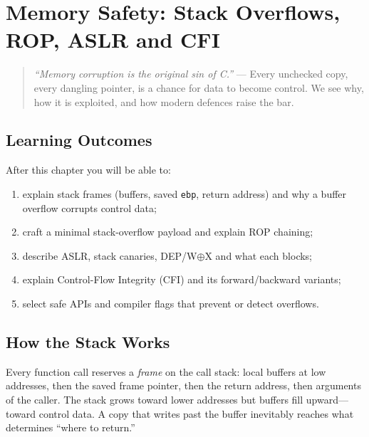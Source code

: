 \chapter{Memory Safety: Stack Overflows, ROP, ASLR and CFI}
\label{ch:memory}

\begin{quote}
\emph{``Memory corruption is the original sin of C.''} --- Every unchecked copy, every dangling pointer, is a chance for data to become control. We see why, how it is exploited, and how modern defences raise the bar.
\end{quote}

\noindent{}
\vspace{0.4em}

\section*{Learning Outcomes}
After this chapter you will be able to:
\begin{enumerate}[label=(L\arabic*)]
    \item explain stack frames (buffers, saved \texttt{ebp}, return address) and why a buffer overflow corrupts control data;
    \item craft a minimal stack-overflow payload and explain ROP chaining;
    \item describe ASLR, stack canaries, DEP/W$\oplus$X and what each blocks;
    \item explain Control-Flow Integrity (CFI) and its forward/backward variants;
    \item select safe APIs and compiler flags that prevent or detect overflows.
\end{enumerate}

\section{How the Stack Works}
\label{sec:stack-model}
Every function call reserves a \emph{frame} on the call stack: local buffers at low addresses, then the saved frame pointer, then the return address, then arguments of the caller. The stack grows toward lower addresses but buffers fill upward---toward control data. A copy that writes past the buffer inevitably reaches what determines ``where to return.''

